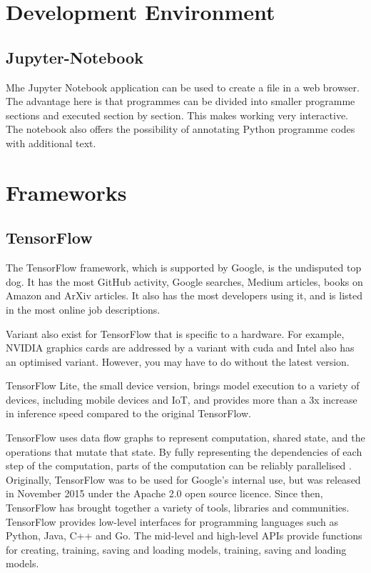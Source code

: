 \section{Development Environment}


\subsection{Jupyter-Notebook}

Mhe Jupyter Notebook application can be used to create a file in a web browser. The advantage here is that programmes can be divided into smaller programme sections and executed section by section. This makes working very interactive. The notebook also offers the possibility of annotating Python programme codes with additional text. \cite{Buxmann:2019}





\section{Frameworks}





\subsection{TensorFlow}


The TensorFlow framework, which is supported by Google, is the undisputed top dog. It has the most GitHub activity, Google searches, Medium articles, books on Amazon and ArXiv articles. It also has the most developers using it, and is listed in the most online job descriptions. \cite{GoogleTensorFlow:2019}

Variant also exist for TensorFlow that is specific to a hardware. For example, NVIDIA graphics cards are addressed by a variant with \ac{cuda} and Intel also has an optimised variant. However, you may have to do without the latest version.

TensorFlow Lite, the small device version, brings model execution to a variety of devices, including mobile devices and IoT, and provides more than a 3x increase in inference speed compared to the original TensorFlow. 

TensorFlow uses data flow graphs to represent computation, shared state, and the operations that mutate that state. By fully representing the dependencies of each step of the computation, parts of the computation can be reliably parallelised \cite{Abadi:2016}. 
Originally, TensorFlow was to be used for Google's internal use, but was
released in November 2015 under the Apache 2.0 open source licence.
Since then, TensorFlow has brought together a variety of tools, libraries and communities.
TensorFlow provides low-level interfaces for programming languages such as Python, Java,
C++ and Go. The mid-level and high-level APIs provide functions for creating, training, saving and loading models,
training, saving and loading models. \cite{Chollet:2018} %


